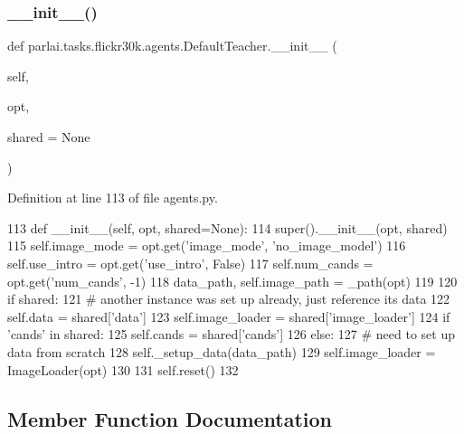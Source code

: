 \subsubsection{\texorpdfstring{\+\_\+\+\_\+init\+\_\+\+\_\+()}{\_\_init\_\_()}}
{\footnotesize\ttfamily def parlai.\+tasks.\+flickr30k.\+agents.\+Default\+Teacher.\+\_\+\+\_\+init\+\_\+\+\_\+ (\begin{DoxyParamCaption}\item[{}]{self,  }\item[{}]{opt,  }\item[{}]{shared = {\ttfamily None} }\end{DoxyParamCaption})}



Definition at line 113 of file agents.\+py.


\begin{DoxyCode}
113     \textcolor{keyword}{def }\_\_init\_\_(self, opt, shared=None):
114         super().\_\_init\_\_(opt, shared)
115         self.image\_mode = opt.get(\textcolor{stringliteral}{'image\_mode'}, \textcolor{stringliteral}{'no\_image\_model'})
116         self.use\_intro = opt.get(\textcolor{stringliteral}{'use\_intro'}, \textcolor{keyword}{False})
117         self.num\_cands = opt.get(\textcolor{stringliteral}{'num\_cands'}, -1)
118         data\_path, self.image\_path = \_path(opt)
119 
120         \textcolor{keywordflow}{if} shared:
121             \textcolor{comment}{# another instance was set up already, just reference its data}
122             self.data = shared[\textcolor{stringliteral}{'data'}]
123             self.image\_loader = shared[\textcolor{stringliteral}{'image\_loader'}]
124             \textcolor{keywordflow}{if} \textcolor{stringliteral}{'cands'} \textcolor{keywordflow}{in} shared:
125                 self.cands = shared[\textcolor{stringliteral}{'cands'}]
126         \textcolor{keywordflow}{else}:
127             \textcolor{comment}{# need to set up data from scratch}
128             self.\_setup\_data(data\_path)
129             self.image\_loader = ImageLoader(opt)
130 
131         self.reset()
132 
\end{DoxyCode}


\subsection{Member Function Documentation}
\mbox{\label{classparlai_1_1tasks_1_1flickr30k_1_1agents_1_1DefaultTeacher_a6a4661fe44f7b4c0d0e8329218bc15f6}} 
